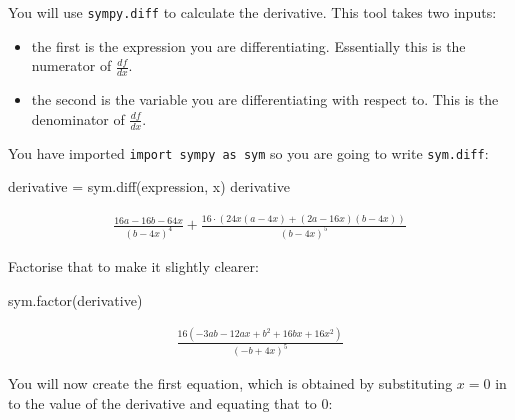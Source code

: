 You will use \texttt{sympy.diff} to calculate the derivative. This tool takes two inputs:
\begin{itemize}
\item 

the first is the expression you are differentiating. Essentially this is the numerator of \(\frac{df}{dx}\).

\item 

the second is the variable you are differentiating with respect to. This is the denominator of \(\frac{df}{dx}\).

\end{itemize}



You have imported \texttt{import sympy as sym} so you are going to write \texttt{sym.diff}:





\begin{pyin}
derivative = sym.diff(expression, x)
derivative
\end{pyin}




\begin{equation*}
\begin{split}\displaystyle \frac{16 a - 16 b - 64 x}{\left(b - 4 x\right)^{4}} + \frac{16 \cdot \left(24 x \left(a - 4 x\right) + \left(2 a - 16 x\right) \left(b - 4 x\right)\right)}{\left(b - 4 x\right)^{5}}\end{split}
\end{equation*}




Factorise that to make it slightly clearer:




\begin{pyin}
sym.factor(derivative)
\end{pyin}




\begin{equation*}
\begin{split}\displaystyle \frac{16 \left(- 3 a b - 12 a x + b^{2} + 16 b x + 16 x^{2}\right)}{\left(- b + 4 x\right)^{5}}\end{split}
\end{equation*}

You will now create the first equation, which is obtained by substituting \(x=0\)
in to the value of the derivative and equating that to \(0\):




